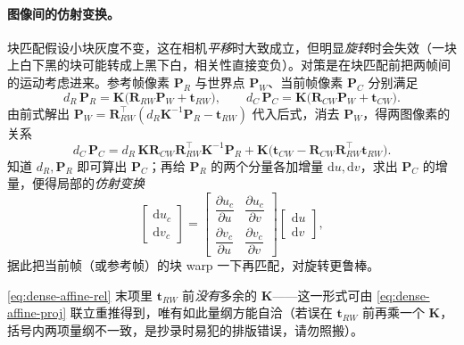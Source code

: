 \paragraph{图像间的仿射变换。}
块匹配假设小块灰度不变，这在相机\emph{平移}时大致成立，但明显\emph{旋转}时会失效（一块上白下黑的块可能转成上黑下白，相关性直接变负）。对策是在块匹配前把两帧间的运动考虑进来。参考帧像素 $\mathbf{P}_R$ 与世界点 $\mathbf{P}_W$、当前帧像素 $\mathbf{P}_C$ 分别满足
\begin{equation}
  d_R\,\mathbf{P}_R=\mathbf{K}\bigl(\mathbf{R}_{RW}\mathbf{P}_W+\mathbf{t}_{RW}\bigr),\qquad
  d_C\,\mathbf{P}_C=\mathbf{K}\bigl(\mathbf{R}_{CW}\mathbf{P}_W+\mathbf{t}_{CW}\bigr).
  \label{eq:dense-affine-proj}
\end{equation}
由前式解出 $\mathbf{P}_W=\mathbf{R}_{RW}^\top(d_R\mathbf{K}^{-1}\mathbf{P}_R-\mathbf{t}_{RW})$ 代入后式，消去 $\mathbf{P}_W$，得两图像素的关系
\begin{equation}
  d_C\,\mathbf{P}_C=d_R\,\mathbf{K}\mathbf{R}_{CW}\mathbf{R}_{RW}^\top\mathbf{K}^{-1}\mathbf{P}_R
   +\mathbf{K}\bigl(\mathbf{t}_{CW}-\mathbf{R}_{CW}\mathbf{R}_{RW}^\top\mathbf{t}_{RW}\bigr).
  \label{eq:dense-affine-rel}
\end{equation}
知道 $d_R,\mathbf{P}_R$ 即可算出 $\mathbf{P}_C$；再给 $\mathbf{P}_R$ 的两个分量各加增量 $\mathrm{d}u,\mathrm{d}v$，求出 $\mathbf{P}_C$ 的增量，便得局部的\emph{仿射变换}
\begin{equation}
  \begin{bmatrix}\mathrm{d}u_c\\\mathrm{d}v_c\end{bmatrix}
  =\begin{bmatrix}\dfrac{\partial u_c}{\partial u}&\dfrac{\partial u_c}{\partial v}\\[2mm]\dfrac{\partial v_c}{\partial u}&\dfrac{\partial v_c}{\partial v}\end{bmatrix}
   \begin{bmatrix}\mathrm{d}u\\\mathrm{d}v\end{bmatrix},
  \label{eq:dense-affine-mat}
\end{equation}
据此把当前帧（或参考帧）的块 warp 一下再匹配，对旋转更鲁棒。

\begin{note}
\cref{eq:dense-affine-rel} 末项里 $\mathbf{t}_{RW}$ 前\emph{没有}多余的 $\mathbf{K}$——这一形式可由 \cref{eq:dense-affine-proj} 联立重推得到，唯有如此量纲方能自洽（若误在 $\mathbf{t}_{RW}$ 前再乘一个 $\mathbf{K}$，括号内两项量纲不一致，是抄录时易犯的排版错误，请勿照搬）\cite{gaoxiang2019slam14}。
\end{note}

